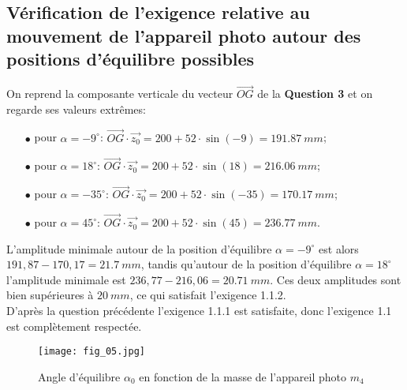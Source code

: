 \subsection{Vérification de l'exigence relative au mouvement de l'appareil photo autour des positions d'équilibre possibles}
\ifprof
\begin{corrige}
On reprend la composante verticale du vecteur $\overrightarrow{OG}$ de la \textbf{Question 3} et on regarde ses valeurs extrêmes:
\begin{itemize}
\item[$\bullet$] pour $\alpha = -9^{\circ}$: $\overrightarrow{OG}\cdot \overrightarrow{z_0} = 200 + 52\cdot \sin(-9) = \SI{191,87}{mm}$;
\item[$\bullet$] pour $\alpha = 18^{\circ}$: $\overrightarrow{OG}\cdot \overrightarrow{z_0} = 200 + 52\cdot \sin(18) = \SI{216,06}{mm}$;
\item[$\bullet$] pour $\alpha = -35^{\circ}$: $\overrightarrow{OG}\cdot \overrightarrow{z_0} = 200 + 52\cdot \sin(-35) = \SI{170,17}{mm}$;
\item[$\bullet$] pour $\alpha = 45^{\circ}$: $\overrightarrow{OG}\cdot \overrightarrow{z_0} = 200 + 52\cdot \sin(45) = \SI{236,77}{mm}$.
\end{itemize}

L'amplitude minimale autour de la position d'équilibre $\alpha = -9^{\circ}$ est alors $191,87-170,17=\SI{21,7}{mm}$, tandis qu'autour de la position  d'équilibre $\alpha = 18^{\circ}$ l'amplitude minimale est $236,77-216,06=\SI{20,71}{mm}$. Ces deux amplitudes sont bien supérieures à $\SI{20}{mm}$, ce qui satisfait l'exigence 1.1.2.\\

D'après la question précédente l'exigence 1.1.1 est satisfaite, donc l'exigence 1.1 est complètement respectée.

\end{corrige}
\else
\fi

\ifprof
\else
\begin{figure}[H]
\centering
\texttt{[image: fig\_05.jpg]}
\caption{\label{fig:05} Angle d'équilibre $\alpha_{0}$ en fonction de la masse de l'appareil photo $m_{4}$}
\end{figure}
\fi


